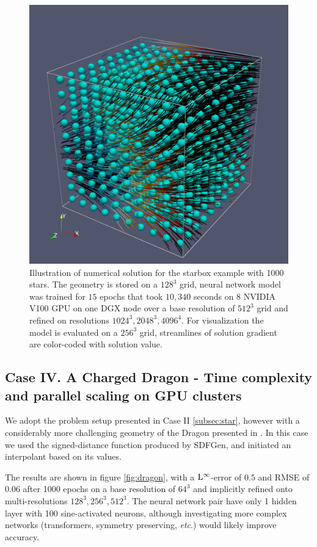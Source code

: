 \documentclass{elsarticle}
\begin{document}
\begin{figure}
	\centering
	\includegraphics[width=\linewidth]{./figures/starbox_512.png}
	\caption{Illustration of numerical solution for the starbox example with 1000 stars. The geometry is stored on a $128^3$ grid, neural network model was trained for $15$ epochs that took $10,340$ seconds on 8 NVIDIA V100 GPU on one DGX node over a base resolution of $512^3$ grid and refined on resolutions $1024^3,2048^3,4096^4$. For visualization the model is evaluated on a $256^3$ grid, streamlines of solution gradient are color-coded with solution value.}
	\label{fig:starbox512}
\end{figure}




\subsection{Case IV. A Charged Dragon - Time complexity and parallel scaling on GPU clusters}
We adopt the problem setup presented in Case II \ref{subsec:star}, however with a considerably more challenging geometry of the Dragon presented in \cite{curless1996volumetric}. In this case we used the signed-distance function produced by SDFGen, and initiated an interpolant based on its values. 


The results are shown in figure \ref{fig:dragon}, with a $\rm L^\infty$-error of $0.5$ and RMSE of $0.06$ after 1000 epochs on a base resolution of $64^3$ and implicitly refined onto multi-resolutions $128^3,256^3,512^3$. The neural network pair have only 1 hidden layer with 100 sine-activated neurons, although investigating more complex networks (transformers, symmetry preserving, \textit{etc}.) would likely improve accuracy.
\end{document}
